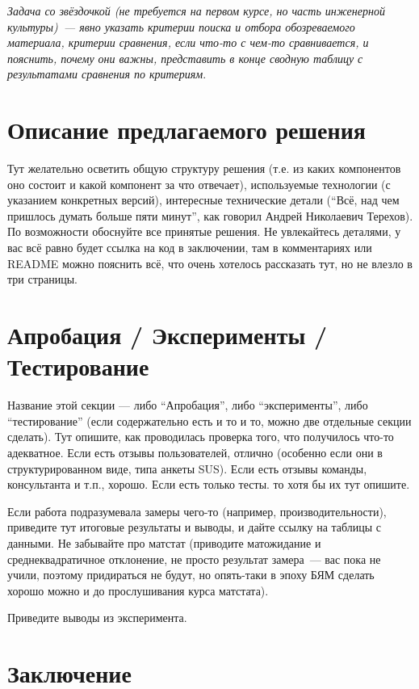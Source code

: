 \documentclass[a4paper]{article}
\begin{document}
\emph{Задача со звёздочкой (не требуется на первом курсе, но часть инженерной культуры)~--- явно указать критерии поиска и отбора обозреваемого материала, критерии сравнения, если что-то с чем-то сравнивается, и пояснить, почему они важны, представить в конце сводную таблицу с результатами сравнения по критериям}.

\section{Описание предлагаемого решения}

Тут желательно осветить общую структуру решения (т.е. из каких компонентов оно состоит и какой компонент за что отвечает), используемые технологии (с указанием конкретных версий), интересные технические детали (\enquote{Всё, над чем пришлось думать больше пяти минут}, как говорил Андрей Николаевич Терехов). По возможности обоснуйте все принятые решения. Не увлекайтесь деталями, у вас всё равно будет ссылка на код в заключении, там в комментариях или README можно пояснить всё, что очень хотелось рассказать тут, но не влезло в три страницы.

\section{Апробация / Эксперименты / Тестирование}


Название этой секции --- либо \enquote{Апробация}, либо \enquote{эксперименты}, либо \enquote{тестирование} (если содержательно есть и то и то, можно две отдельные секции сделать). Тут опишите, как проводилась проверка того, что получилось что-то адекватное. Если есть отзывы пользователей, отлично (особенно если они в структурированном виде, типа анкеты SUS). Если есть отзывы команды, консультанта и т.п., хорошо. Если есть только тесты. то хотя бы их тут опишите.

Если работа подразумевала замеры чего-то (например, производительности), приведите тут итоговые результаты и выводы, и дайте ссылку на таблицы с данными. Не забывайте про матстат (приводите матожидание и среднеквадратичное отклонение, не просто результат замера~--- вас пока не учили, поэтому придираться не будут, но опять-таки в эпоху БЯМ сделать хорошо можно и до прослушивания курса матстата).

Приведите выводы из эксперимента.

\section{Заключение}
\end{document}
